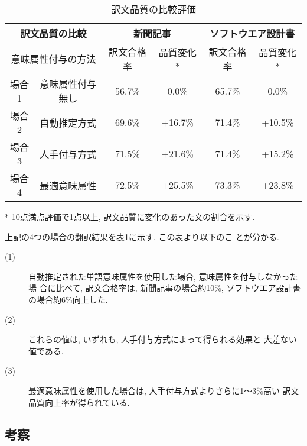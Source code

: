 \begin{table}[htbp]
  \caption{訳文品質の比較評価}
  \label{tab:8}
  \begin{center}
    \leavevmode
    \begin{tabular}{|c|c|c|c|c|c|}
      \hline
      \multicolumn{2}{|c|}{訳文品質の比較} & \multicolumn{2}{|c|}{新聞記事} & \multicolumn{2}{|c|}{ソフトウエア設計書} \\ \hline
      \multicolumn{2}{|c|}{意味属性付与の方法} & 訳文合格率 & 品質変化* & 訳文合格率 & 品質変化* \\  \hline
      場合1 & 意味属性付与無し & 56.7\% & 0.0\% & 65.7\% & 0.0\% \\\hline
      場合2 & 自動推定方式 & 69.6\% & +16.7\% & 71.4\% & +10.5\% \\\hline
      場合3 & 人手付与方式 & 71.5\% & +21.6\% & 71.4\% & +15.2\% \\\hline
      場合4 & 最適意味属性 & 72.5\% & +25.5\% & 73.3\% & +23.8\% \\\hline
    \end{tabular}

    \vspace{1.5mm} * 10点満点評価で1点以上, 訳文品質に変化のあった文の割合を示す. \vspace{-1mm} 
  \end{center}
\end{table}


上記の4つの場合の翻訳結果を表\ref{tab:8}に示す. この表より以下のこ
とが分かる.  

\begin{description}
\item[(1)] 自動推定された単語意味属性を使用した場合, 意味属性を付与しなかった場                            
合に比べて, 訳文合格率は, 新聞記事の場合約10\%, ソフトウエア設計書                            
の場合約6\%向上した.                                                                             
\item[(2)] これらの値は, いずれも, 人手付与方式によって得られる効果と
大差ない値である.  
\item[(3)] 最適意味属性を使用した場合は, 人手付与方式よりさらに1〜3\%高い
訳文品質向上率が得られている.  
\end{description}


\subsection{考察}
\label{sec:5.3}


